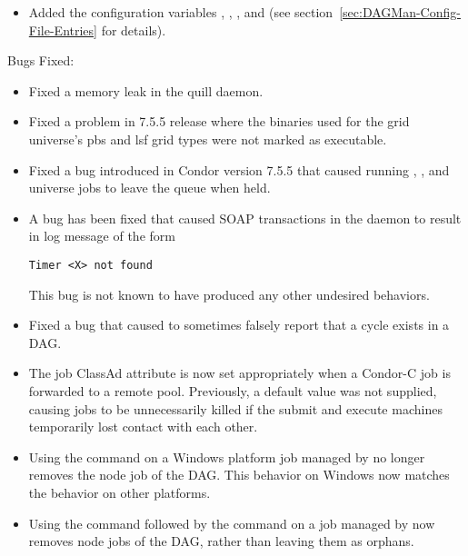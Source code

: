 \begin{itemize}
\item Added the configuration variables ,
, ,
and  (see
section~\ref{sec:DAGMan-Config-File-Entries} for details).

\end{itemize}

\noindent Bugs Fixed:

\begin{itemize}

\item Fixed a memory leak in the quill daemon.

\item Fixed a problem in 7.5.5 release where the binaries used for
  the grid universe's pbs and lsf grid types were not marked as
  executable.

\item Fixed a bug introduced in Condor version 7.5.5
that caused running , ,
and  universe jobs to leave the queue when held.

\item A bug has been fixed that caused SOAP transactions in the
   daemon to result in log message of the form 
\begin{verbatim}
Timer <X> not found
\end{verbatim}
  This bug is not known to have produced any other
  undesired behaviors.

\item Fixed a bug that caused  to sometimes falsely
report that a cycle exists in a DAG.

\item The job ClassAd attribute  is now set 
appropriately when a Condor-C job is forwarded to a remote pool.
Previously, a default value was not supplied,
causing jobs to be unnecessarily killed if the
submit and execute machines temporarily lost contact with each other.

\item Using the  command on a Windows platform job managed
by  no longer
removes the node job of the DAG.
This behavior on Windows now matches the behavior on other platforms.

\item Using the  command followed by the  
command on a job managed by 
now removes node jobs of the DAG, rather than leaving them as orphans.


\end{itemize}
